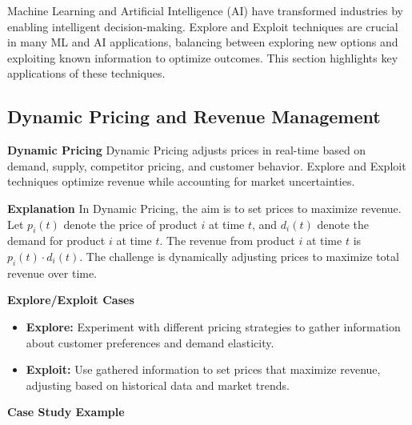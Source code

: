 \documentclass[12pt]{book} %
\begin{document}
Machine Learning and Artificial Intelligence (AI) have transformed industries by enabling intelligent decision-making. Explore and Exploit techniques are crucial in many ML and AI applications, balancing between exploring new options and exploiting known information to optimize outcomes. This section highlights key applications of these techniques.

\subsection{Dynamic Pricing and Revenue Management}

\textbf{Dynamic Pricing}
Dynamic Pricing adjusts prices in real-time based on demand, supply, competitor pricing, and customer behavior. Explore and Exploit techniques optimize revenue while accounting for market uncertainties.

\textbf{Explanation}
In Dynamic Pricing, the aim is to set prices to maximize revenue. Let \(p_i(t)\) denote the price of product \(i\) at time \(t\), and \(d_i(t)\) denote the demand for product \(i\) at time \(t\). The revenue from product \(i\) at time \(t\) is \(p_i(t) \cdot d_i(t)\). The challenge is dynamically adjusting prices to maximize total revenue over time.

\textbf{Explore/Exploit Cases}
\begin{itemize}
    \item \textbf{Explore:} Experiment with different pricing strategies to gather information about customer preferences and demand elasticity.
    \item \textbf{Exploit:} Use gathered information to set prices that maximize revenue, adjusting based on historical data and market trends.
\end{itemize}

\textbf{Case Study Example}
\end{document}
